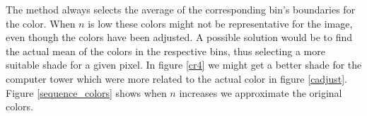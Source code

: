 \documentclass[a4paper, 10pt, final]{article}
\begin{document}
The method always selects the average of the corresponding bin's
boundaries for the color. When $n$ is low these colors might not be
representative for the image, even though the colors have been adjusted.
A possible solution would be to find the actual mean of the colors in
the respective bins, thus selecting a more suitable shade for a given
pixel. In figure \ref{cr4} we might get a better shade for the computer
tower which were more related to the actual color in figure
\ref{cadjust}. Figure \ref{sequence_colors} shows when $n$ increases we
approximate the original colors.

\begin{figure}[!h]
    \centering
    \\
    \\

\end{figure}
\end{document}
